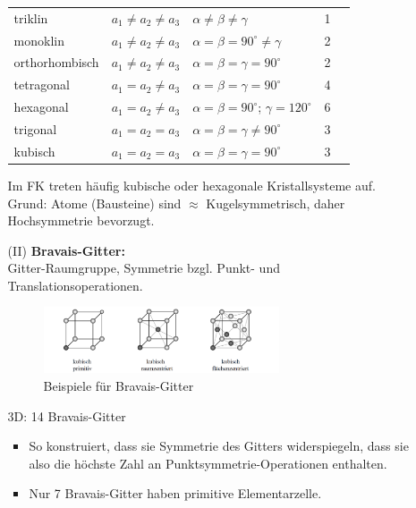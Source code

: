 \begin{itemize}
\begin{itemize}
\begin{table}[H]
\begin{tabular}{l|llll}
                  triklin & $a_1 \neq a_2 \neq a_3$ & $\alpha \neq \beta \neq \gamma$ & 1 &  \\
                  monoklin & $a_1 \neq a_2 \neq a_3$ & $\alpha = \beta = 90^{\circ} \neq \gamma$ & 2 &  \\
                  orthorhombisch & $a_1 \neq a_2 \neq a_3$ & $\alpha = \beta = \gamma = 90^{\circ}$ & 2 &  \\
                  tetragonal & $a_1 = a_2 \neq a_3$ & $\alpha = \beta = \gamma = 90^{\circ}$ & 4 &  \\
                  hexagonal & $a_1 = a_2 \neq a_3$ & $\alpha = \beta = 90^{\circ}$; $\gamma = 120^{\circ}$ & 6 &  \\
                  trigonal & $a_1 = a_2 = a_3$ & $\alpha = \beta  = \gamma \neq 90^{\circ}$ & 3 &  \\
                  kubisch & $a_1 = a_2 = a_3$ & $\alpha = \beta = \gamma = 90^{\circ}$ & 3 &  \\
                \end{tabular}
            \end{table}
            Im FK treten häufig kubische oder hexagonale Kristallsysteme auf. Grund: Atome (Bausteine) sind $\approx$ Kugelsymmetrisch, daher Hochsymmetrie bevorzugt.
            \item[(II)] \textbf{Bravais-Gitter:}\\
            Gitter-Raumgruppe, Symmetrie bzgl. Punkt- und Translationsoperationen.
            \begin{figure}[H]
                \centering
                \includegraphics[width=0.7\textwidth]{figures/2_1KubischGitter}
                \caption{Beispiele für Bravais-Gitter}
            \end{figure}
            3D: 14 Bravais-Gitter
            \begin{itemize}
                \item So konstruiert, dass sie Symmetrie des Gitters widerspiegeln, dass sie also die höchste Zahl an Punktsymmetrie-Operationen enthalten.
                \item Nur 7 Bravais-Gitter haben primitive Elementarzelle.
            \end{itemize}
        \end{itemize}
\end{itemize}
